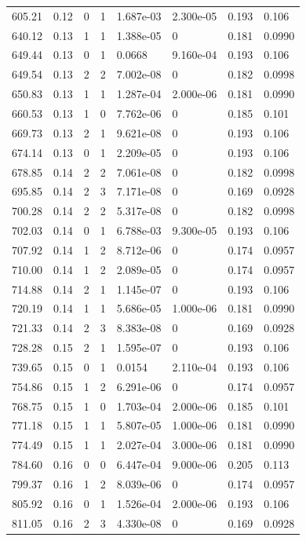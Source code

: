 \documentclass[preview]{standalone}
\begin{document}
{{{\begin{tabular}{L{1.2cm}C{1.2cm} C{0.3cm}C{0.5cm} C{1.4cm}C{1.4cm} C{1.4cm}C{1.4cm}}
  605.21  &  0.12  & 0     &  1 &  1.687e-03  & 2.300e-05  & 0.193 &  0.106   \\ 
  640.12  &  0.13  & 1     &  1 &  1.388e-05  & 0  & 0.181 &  0.0990   \\ 
  649.44  &  0.13  & 0     &  1 &  0.0668  & 9.160e-04  & 0.193 &  0.106   \\ 
  649.54  &  0.13  & 2     &  2 &  7.002e-08  & 0  & 0.182 &  0.0998   \\ 
  650.83  &  0.13  & 1     &  1 &  1.287e-04  & 2.000e-06  & 0.181 &  0.0990   \\ 
  660.53  &  0.13  & 1     &  0 &  7.762e-06  & 0  & 0.185 &  0.101   \\ 
  669.73  &  0.13  & 2     &  1 &  9.621e-08  & 0  & 0.193 &  0.106   \\ 
  674.14  &  0.13  & 0     &  1 &  2.209e-05  & 0  & 0.193 &  0.106   \\ 
  678.85  &  0.14  & 2     &  2 &  7.061e-08  & 0  & 0.182 &  0.0998   \\ 
  695.85  &  0.14  & 2     &  3 &  7.171e-08  & 0  & 0.169 &  0.0928   \\ 
  700.28  &  0.14  & 2     &  2 &  5.317e-08  & 0  & 0.182 &  0.0998   \\ 
  702.03  &  0.14  & 0     &  1 &  6.788e-03  & 9.300e-05  & 0.193 &  0.106   \\ 
  707.92  &  0.14  & 1     &  2 &  8.712e-06  & 0  & 0.174 &  0.0957   \\ 
  710.00  &  0.14  & 1     &  2 &  2.089e-05  & 0  & 0.174 &  0.0957   \\ 
  714.88  &  0.14  & 2     &  1 &  1.145e-07  & 0  & 0.193 &  0.106   \\ 
  720.19  &  0.14  & 1     &  1 &  5.686e-05  & 1.000e-06  & 0.181 &  0.0990   \\ 
  721.33  &  0.14  & 2     &  3 &  8.383e-08  & 0  & 0.169 &  0.0928   \\ 
  728.28  &  0.15  & 2     &  1 &  1.595e-07  & 0  & 0.193 &  0.106   \\ 
  739.65  &  0.15  & 0     &  1 &  0.0154  & 2.110e-04  & 0.193 &  0.106   \\ 
  754.86  &  0.15  & 1     &  2 &  6.291e-06  & 0  & 0.174 &  0.0957   \\ 
  768.75  &  0.15  & 1     &  0 &  1.703e-04  & 2.000e-06  & 0.185 &  0.101   \\ 
  771.18  &  0.15  & 1     &  1 &  5.807e-05  & 1.000e-06  & 0.181 &  0.0990   \\ 
  774.49  &  0.15  & 1     &  1 &  2.027e-04  & 3.000e-06  & 0.181 &  0.0990   \\ 
  784.60  &  0.16  & 0     &  0 &  6.447e-04  & 9.000e-06  & 0.205 &  0.113   \\ 
  799.37  &  0.16  & 1     &  2 &  8.039e-06  & 0  & 0.174 &  0.0957   \\ 
  805.92  &  0.16  & 0     &  1 &  1.526e-04  & 2.000e-06  & 0.193 &  0.106   \\ 
  811.05  &  0.16  & 2     &  3 &  4.330e-08  & 0  & 0.169 &  0.0928   \\ 
\hline 
\end{tabular} 

}}}
\end{document}

